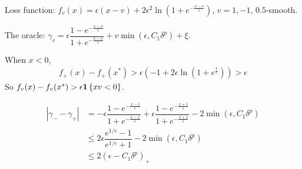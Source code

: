 \documentclass[11pt,letterpaper,english]{article}
\begin{document}
Loss function: $f_v(x) =\epsilon\left( x-v\right)+2\epsilon^2 \ln\left(1+e^{-\frac{x-v}{\epsilon}}  \right)$, $v= 1, -1$, $0.5$-smooth.

The oracle: $\gamma_v = \epsilon \dfrac{1-e^{-\frac{x-v}{\epsilon}}}{1+e^{-\frac{x-v}{\epsilon}}}+v \min \left( \epsilon, C_1 \delta^p \right)+\xi$.

When $x<0$, 
\begin{align*}
f_+(x)-f_+(x^*) >\epsilon\left( -1 +2\epsilon \ln\left( 1+e^{\frac{1}{\epsilon}} \right) \right)>\epsilon
\end{align*}
So $f_v(x)-f_v(x^*)>\epsilon \mathbf{1}\left\{x v  < 0\right\}$.

\begin{align*}
|\gamma_--\gamma_+| &= -\epsilon \dfrac{1-e^{-\frac{x-1}{\epsilon}}}{1+e^{-\frac{x-1}{\epsilon}}} + \epsilon \dfrac{1-e^{-\frac{x+1}{\epsilon}}}{1+e^{-\frac{x+1}{\epsilon}}}-2 \min \left( \epsilon, C_1 \delta^p \right)\\
&\leq 2\epsilon \dfrac{e^{1/\epsilon}-1}{e^{1/\epsilon}+1}-2 \min \left( \epsilon, C_1 \delta^p \right)\\
&\leq 2\left( \epsilon -C_1\delta^p \right)_+
\end{align*}
\end{document}
